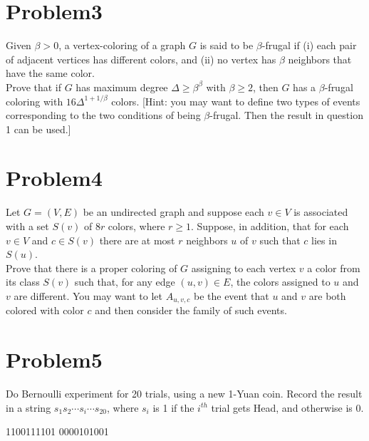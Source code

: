 \documentclass[12pt]{article}
\begin{document}
\section{Problem3}
Given $\beta > 0$, a vertex-coloring of a graph $G$ is said to be $\beta$-frugal if (i) each pair of adjacent vertices has different colors, and (ii) no vertex has $\beta$ neighbors that have the same color.\\
Prove that if $G$ has maximum degree $\Delta \ge \beta^\beta$ with $\beta \ge 2$, then $G$ has a $\beta$-frugal coloring with $16\Delta^{1+1/\beta}$ colors. [Hint: you may want to define two types of events corresponding to the two conditions of being $\beta$-frugal. Then the result in question 1 can be used.]

\section{Problem4}
Let $G = (V,E)$ be an undirected graph and suppose each $v \in V$ is associated with a set $S(v)$ of $8r$ colors, where $r \ge 1$. Suppose, in addition, that for each $v \in V$ and $c \in S(v)$ there are at most $r$ neighbors $u$ of $v$ such that $c$ lies in $S(u)$. \\
Prove that there is a proper coloring of $G$ assigning to each vertex $v$ a color from its class $S(v)$ such that, for any edge $(u, v) \in E$, the colors assigned to $u$ and $v$ are different. You may want to let $A_{u,v,c}$ be the event that $u$ and $v$ are both colored with color $c$ and then consider the family of such events.

\section{Problem5}
Do Bernoulli experiment for 20 trials, using a new 1-Yuan coin. Record the result in a
string $s_1s_2 \cdots s_i \cdots s_{20}$, where $s_i$ is 1 if the $i^{th}$ trial gets Head, and otherwise is 0.

1100111101 0000101001
\end{document}
